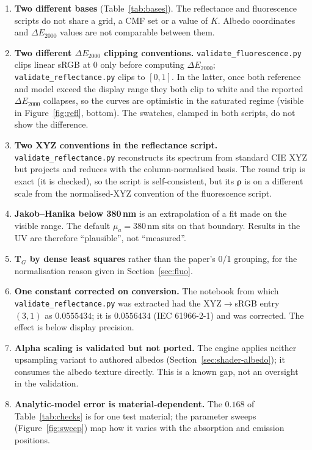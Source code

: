 \documentclass[11pt,a4paper]{article}
\newcommand{\mTG}{\mathbf{T}_{\!G}}
\newcommand{\vrho}{\boldsymbol{\rho}}
\newcommand{\dE}{\Delta E_{2000}}
\newcommand{\file}[1]{\texttt{#1}}
\begin{document}
\begin{enumerate}
  \item \textbf{Two different bases} (Table~\ref{tab:bases}).  The reflectance
        and fluorescence scripts do not share a grid, a CMF set or a value of
        $K$.  Albedo coordinates and $\dE$ values are not comparable between
        them.
  \item \textbf{Two different $\dE$ clipping conventions.}
        \file{validate\_fluorescence.py} clips linear sRGB at $0$ only before
        computing $\dE$; \file{validate\_reflectance.py} clips to $[0,1]$.  In the
        latter, once both reference and model exceed the display range they
        both clip to white and the reported $\dE$ collapses, so the curves are
        optimistic in the saturated regime (visible in Figure~\ref{fig:refl},
        bottom).  The swatches, clamped in both scripts, do not show the
        difference.
  \item \textbf{Two XYZ conventions in the reflectance script.}
        \file{validate\_reflectance.py} reconstructs its spectrum from standard
        CIE XYZ but projects and reduces with the column-normalised basis.  The
        round trip is exact (it is checked), so the script is self-consistent,
        but its $\vrho$ is on a different scale from the normalised-XYZ
        convention of the fluorescence script.
  \item \textbf{Jakob--Hanika below 380\,nm} is an extrapolation of a fit made on
        the visible range.  The default $\mu_a=380$\,nm sits on that boundary.
        Results in the UV are therefore ``plausible'', not ``measured''.
  \item \textbf{$\mTG$ by dense least squares} rather than the paper's 0/1
        grouping, for the normalisation reason given in
        Section~\ref{sec:fluo}.
  \item \textbf{One constant corrected on conversion.}  The notebook from which
        \file{validate\_reflectance.py} was extracted had the XYZ$\to$sRGB entry
        $(3,1)$ as $0.0555434$; it is $0.0556434$ (IEC 61966-2-1) and was
        corrected.  The effect is below display precision.
  \item \textbf{Alpha scaling is validated but not ported.}  The engine applies
        neither upsampling variant to authored albedos
        (Section~\ref{sec:shader-albedo}); it consumes the albedo texture
        directly.  This is a known gap, not an oversight in the validation.
  \item \textbf{Analytic-model error is material-dependent.}  The $0.168$ of
        Table~\ref{tab:checks} is for one test material; the parameter sweeps
        (Figure~\ref{fig:sweep}) map how it varies with the absorption and
        emission positions.
\end{enumerate}
\end{document}
